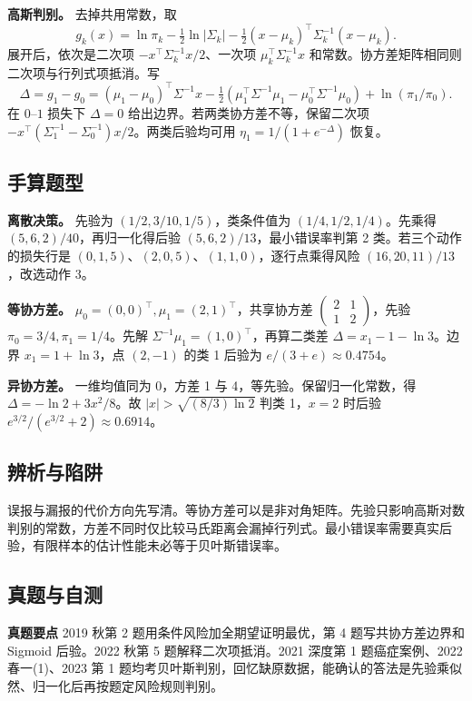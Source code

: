 \documentclass[UTF8,a4paper,zihao=-4,fontset=fandol]{ctexart}
\begin{document}
\textbf{高斯判别。} 去掉共用常数，取
\[
 g_k(x)=\ln\pi_k-\tfrac12\ln|\Sigma_k|
             -\tfrac12(x-\mu_k)^\top\Sigma_k^{-1}(x-\mu_k).
\]
展开后，依次是二次项 \(-x^\top\Sigma_k^{-1}x/2\)、一次项 \(\mu_k^\top\Sigma_k^{-1}x\) 和常数。协方差矩阵相同则二次项与行列式项抵消。写
\[
 \Delta=g_1-g_0=(\mu_1-\mu_0)^\top\Sigma^{-1}x
 -\tfrac12(\mu_1^\top\Sigma^{-1}\mu_1-\mu_0^\top\Sigma^{-1}\mu_0)
 +\ln(\pi_1/\pi_0).
\]
在 \(0\)--\(1\) 损失下 \(\Delta=0\) 给出边界。若两类协方差不等，保留二次项 \(-x^\top(\Sigma_1^{-1}-\Sigma_0^{-1})x/2\)。两类后验均可用 \(\eta_1=1/(1+e^{-\Delta})\) 恢复。

\subsection{手算题型}
\textbf{离散决策。} 先验为 \((1/2,3/10,1/5)\)，类条件值为 \((1/4,1/2,1/4)\)。先乘得 \((5,6,2)/40\)，再归一化得后验 \((5,6,2)/13\)，最小错误率判第 2 类。若三个动作的损失行是 \((0,1,5)\)、\((2,0,5)\)、\((1,1,0)\)，逐行点乘得风险 \((16,20,11)/13\)，改选动作 3。

\textbf{等协方差。} \(\mu_0=(0,0)^\top,\mu_1=(2,1)^\top\)，共享协方差 \(\left(\begin{smallmatrix}2&1\\1&2\end{smallmatrix}\right)\)，先验 \(\pi_0=3/4,\pi_1=1/4\)。先解 \(\Sigma^{-1}\mu_1=(1,0)^\top\)，再算二类差 \(\Delta=x_1-1-\ln3\)。边界 \(x_1=1+\ln3\)，点 \((2,-1)\) 的类 1 后验为 \(e/(3+e)\approx0.4754\)。

\textbf{异协方差。} 一维均值同为 0，方差 1 与 4，等先验。保留归一化常数，得 \(\Delta=-\ln2+3x^2/8\)。故 \(|x|>\sqrt{(8/3)\ln2}\) 判类 1，\(x=2\) 时后验 \(e^{3/2}/(e^{3/2}+2)\approx0.6914\)。

\subsection{辨析与陷阱}
误报与漏报的代价方向先写清。等协方差可以是非对角矩阵。先验只影响高斯对数判别的常数，方差不同时仅比较马氏距离会漏掉行列式。最小错误率需要真实后验，有限样本的估计性能未必等于贝叶斯错误率。

\subsection{真题与自测}
\textbf{真题要点} 2019 秋第 2 题用条件风险加全期望证明最优，第 4 题写共协方差边界和 Sigmoid 后验。2022 秋第 5 题解释二次项抵消。2021 深度第 1 题癌症案例、2022 春一(1)、2023 第 1 题均考贝叶斯判别，回忆缺原数据，能确认的答法是先验乘似然、归一化后再按题定风险规则判别。
\end{document}
